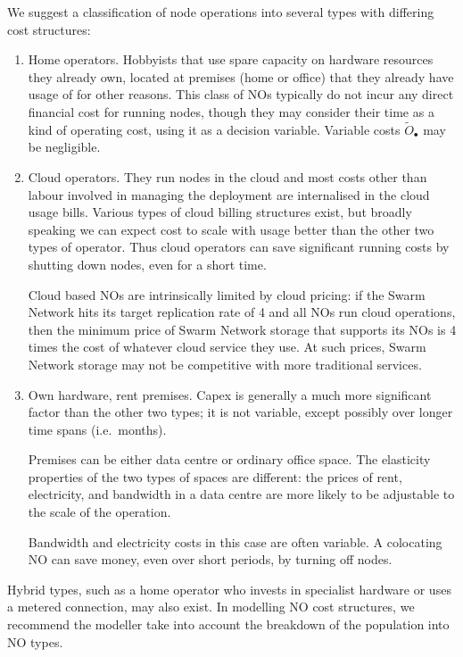 We suggest a classification of node operations into several types with differing cost structures:
%
\begin{enumerate}
  \item 
    Home operators. 
    Hobbyists that use spare capacity on hardware resources they already own, located at premises (home or office) that they already have usage of for other reasons.
    This class of NOs typically do not incur any direct financial cost for running nodes, though they may consider their time as a kind of operating cost, using it as a decision variable.
    Variable costs $\tilde{O}_\bullet$ may be negligible.

  \item
    Cloud operators.
    They run nodes in the cloud and most costs other than labour involved in managing the deployment are internalised in the cloud usage bills.
    Various types of cloud billing structures exist, but broadly speaking we can expect cost to scale with usage better than the other two types of operator.
    Thus cloud operators can save significant running costs by shutting down nodes, even for a short time.
    
    Cloud based NOs are intrinsically limited by cloud pricing: if the Swarm Network hits its target replication rate of 4 and all NOs run cloud operations, then the minimum price of Swarm Network storage that supports its NOs is 4 times the cost of whatever cloud service they use.
    At such prices, Swarm Network storage may not be competitive with more traditional services.

  \item
    Own hardware, rent premises. Capex is generally a much more significant factor than the other two types; it is not variable, except possibly over longer time spans (i.e.~months).

    Premises can be either data centre or ordinary office space.
    The elasticity properties of the two types of spaces are different: the prices of rent, electricity, and bandwidth in a data centre are more likely to be adjustable to the scale of the operation.
    
    Bandwidth and electricity costs in this case are often variable.
    A colocating NO can save money, even over short periods, by turning off nodes.

\end{enumerate}

Hybrid types, such as a home operator who invests in specialist hardware or uses a metered connection, may also exist.
%
In modelling NO cost structures, we recommend the modeller take into account the breakdown of the population into NO types.

